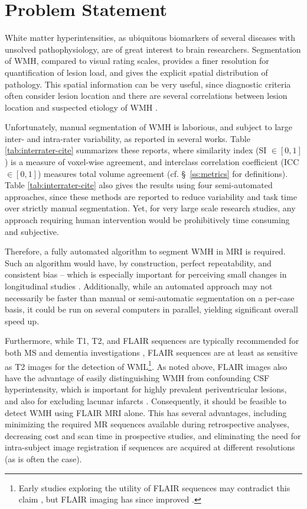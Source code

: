 \section{Problem Statement}
White matter hyperintensities, as ubiquitous biomarkers of several diseases with unsolved pathophysiology, are of great interest to brain researchers. Segmentation of WMH, compared to visual rating scales, provides a finer resolution for quantification of lesion load, and gives the explicit spatial distribution of pathology. This spatial information can be very useful, since diagnostic criteria often consider lesion location \cite{Sorbi2012} and there are several correlations between lesion location and suspected etiology of WMH \cite{Kim2008,Wardlaw2015}.
\par
Unfortunately, manual segmentation of WMH is laborious, and subject to large inter- and intra-rater variability, as reported in several works. Table \ref{tab:interrater-cite} summarizes these reports, where similarity index (SI $\in [0,1]$) is a measure of voxel-wise agreement, and interclass correlation coefficient (ICC $\in [0,1]$) measures total volume agreement (cf. \S\ \ref{ss:metrics} for definitions). Table \ref{tab:interrater-cite} also gives the results using four semi-automated approaches, since these methods are reported to reduce variability and task time over strictly manual segmentation. Yet, for very large scale research studies, any approach requiring human intervention would be prohibitively time consuming and subjective. 
\par 
Therefore, a fully automated algorithm to segment WMH in MRI is required. Such an algorithm would have, by construction, perfect repeatability, and consistent bias -- which is especially important for perceiving small changes in longitudinal studies \cite{MSISBI2015}. Additionally, while an automated approach may not necessarily be faster than manual or semi-automatic segmentation on a per-case basis, it could be run on several computers in parallel, yielding significant overall speed up.
\par
Furthermore, while T1, T2, and FLAIR sequences are typically recommended for both MS and dementia investigations \cite{Simon2006,Wardlaw2013,Traboulsee2015}, FLAIR sequences are at least as sensitive as T2 images for the detection of WML\footnote{Early studies exploring the utility of FLAIR sequences may contradict this claim \cite{Okuda1999,Rovaris2000}, but FLAIR imaging has since improved \cite{Wardlaw2015}.}. As noted above, FLAIR images also have the advantage of easily distinguishing WMH from confounding CSF hyperintensity, which is important for highly prevalent periventricular lesions, and also for excluding lacunar infarcts \cite{Bakshi2001,Barkhof2002}. Consequently, it should be feasible to detect WMH using FLAIR MRI alone. This has several advantages, including minimizing the required MR sequences available during retrospective analyses, decreasing cost and scan time in prospective studies, and eliminating the need for intra-subject image registration if sequences are acquired at different resolutions (as is often the case).
